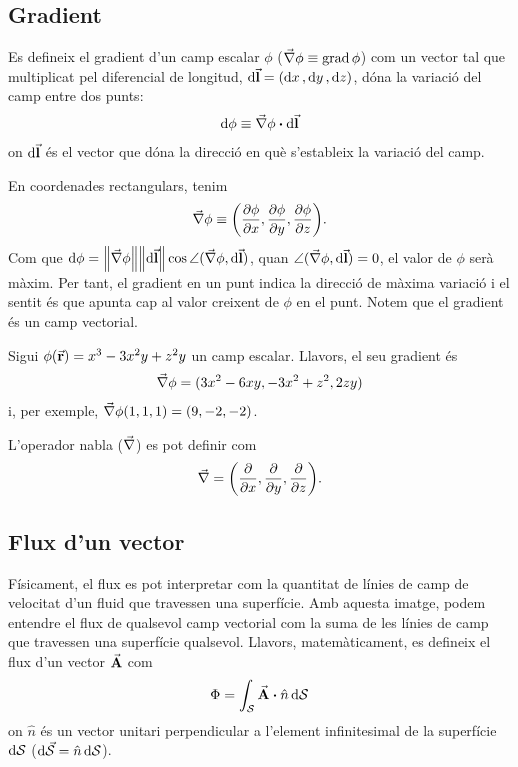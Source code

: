 \subsection{Gradient}
Es defineix el gradient d'un camp escalar $\phi$ ($\vec{\nabla} \phi \equiv \operatorname{grad} \phi$) com un vector tal que multiplicat pel diferencial de longitud, $\dd{\va{l}} = (\dd{x}, \dd{y}, \dd{z})$, dóna la variació del camp entre dos punts:
\begin{align}
	\dd{\phi} \equiv \grad{\phi} \vdot \dd{\va{l}}
\end{align}
on $\dd{\va{l}}$ és el vector que dóna la direcció en què s'estableix la variació del camp.

En coordenades rectangulars, tenim
\begin{align}
	\vec{\nabla} \phi \equiv \qty( \pdv{\phi}{x}, \pdv{\phi}{y}, \pdv{\phi}{z} ).
\end{align}
Com que $\dd{\phi} = \norm{\vec{\nabla} \phi} \norm{\dd{\va{l}}} \cos \angle(\vec{\nabla} \phi, \dd{ \va{l}})$, quan $\angle(\vec{\nabla} \phi, \dd{\va{l}}) = 0$, el valor de $\phi$ serà màxim. Per tant, el gradient en un punt indica la direcció de màxima variació i el sentit és que apunta cap al valor creixent de $\phi$ en el punt. Notem que el gradient és un camp vectorial.
\begin{example}
	Sigui $\phi (\va{r}) = x^{3} - 3x^{2}y + z^{2}y$ un camp escalar. Llavors, el seu gradient és
	\begin{align*}
		\vec{\nabla} \phi = (3x^{2}-6xy, -3x^{2} + z^{2}, 2zy)
	\end{align*}
	i, per exemple, $\vec{\nabla} \phi (1,1,1) = (9, -2, -2)$.
\end{example}
\begin{defi}
	L'operador nabla ($\vec{\nabla}$) es pot definir com
	\begin{align}
		\vec{\nabla} = \qty( \pdv{}{x}, \pdv{}{y}, \pdv{}{z} ).
	\end{align}
\end{defi}

\subsection{Flux d'un vector}
Físicament, el flux es pot interpretar com la quantitat de línies de camp de velocitat d'un fluid que travessen una superfície. Amb aquesta imatge, podem entendre el flux de qualsevol camp vectorial com la suma de les línies de camp que travessen una superfície qualsevol. Llavors, matemàticament, es defineix el flux d'un vector $\va{A}$ com
\begin{align}
	\Phi = \int_{\mc{S}} \va{A} \vdot \hat{n} \dd{\mc{S}}
\end{align}
on $\hat{n}$ és un vector unitari perpendicular a l'element infinitesimal de la superfície $\dd{\mathcal{S}}$ ($\dd{\va{\mathcal{S}}} = \hat{n}\dd{\mathcal{S}}$).

